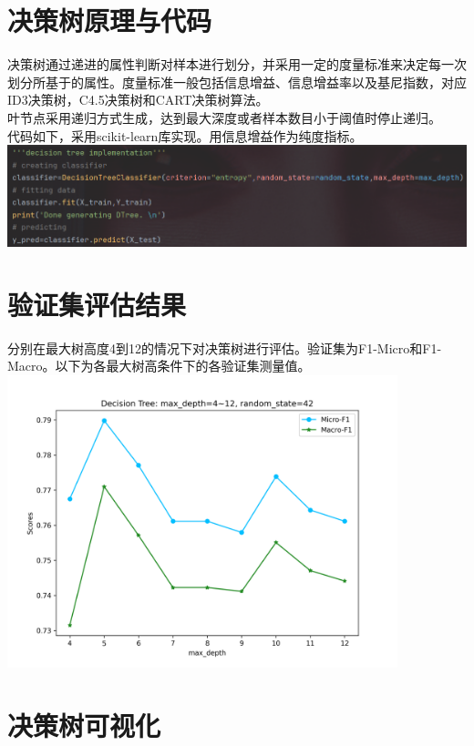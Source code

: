 \documentclass{article}
\begin{document}
\section{决策树原理与代码}
决策树通过递进的属性判断对样本进行划分，并采用一定的度量标准来决定每一次划分所基于的属性。度量标准一般包括信息增益、信息增益率以及基尼指数，对应ID3决策树，C4.5决策树和CART决策树算法。\\
叶节点采用递归方式生成，达到最大深度或者样本数目小于阈值时停止递归。\\
代码如下，采用scikit-learn库实现。用信息增益作为纯度指标。\\
\includegraphics[width=1.0\textwidth]{code_screenshot/DTreeMain.png}\\
\section{验证集评估结果}
分别在最大树高度4到12的情况下对决策树进行评估。验证集为F1-Micro和F1-Macro。以下为各最大树高条件下的各验证集测量值。\\
\includegraphics[width=0.85\textwidth]{../python/result/compare_4_to_12.png}\\
\section{决策树可视化}
\end{document}
